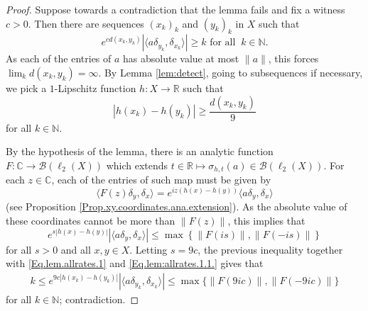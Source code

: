 \documentclass[11pt]{amsart}
\newcommand{\R}{\mathbb{R}}
\newcommand{\N}{\mathbb{N}}
\newcommand{\C}{\mathbb{C}}
\newcommand{\cB}{\mathcal{B}}
\numberwithin{equation}{section}
\theoremstyle{definition}
\theoremstyle{remark}
\begin{document}
\begin{proof}
Suppose towards a contradiction that the lemma fails and fix a witness $c>0$. Then there are sequences $(x_k)_k$ and $(y_k)_k$ in $X$ such that
\begin{equation}\label{Eq.lem.allrates.1}e^{cd(x_k,y_k)}|\langle a\delta_{y_k},\delta_{x_k}\rangle|\geq k \text{ for all }\  k\in\N.
\end{equation} As each of the entries of $a$ has absolute value at most $\|a\|$,  this forces   $\lim_kd(x_k,y_k)=\infty$. By Lemma \ref{lem:detect}, going to subsequences if necessary, we  pick a  $1$-Lipschitz function $h\colon X\to \R$ such that
\begin{equation}\label{Eq.lem:allrates.1.1.} |h(x_{k})-h(y_{k})|\geq \frac{d(x_k,y_k)}{9}\end{equation}
for all $k\in\N$.

By the hypothesis of the lemma, there is an analytic function $F\colon \C\to \cB(\ell_2(X))$ which extends $t\in \R\mapsto \sigma_{h,t}(a)\in \cB(\ell_2(X))$. For each $z\in \C$, each of the entries of such map must be given by
\[\langle F(z)\delta_y,\delta_x\rangle=e^{iz(h(x)-h(y))}\langle a\delta_y,\delta_x\rangle\]
(see Proposition \ref{Prop.xy.coordinates.ana.extension}).
As the absolute value of these coordinates cannot be more than $\|F(z)\|$, this implies that
\[e^{s|h(x)-h(y)|} |\langle a\delta_y,\delta_x\rangle|\leq \max\left\{\|F(is)\|,\|F(-is)\|\right\}\]
for all $s>0$ and all $x,y\in X$. Letting $s=9c$, the previous inequality together with \eqref{Eq.lem.allrates.1} and \eqref{Eq.lem:allrates.1.1.} gives that
\begin{align*}k\leq e^{9c|h(x_k)-h(y_k)|}|\langle a\delta_{y_k},\delta_{x_k}\rangle|\leq \max\{\|F(9ic)\|,\|F(-9ic)\|\}
\end{align*}
for all $k\in\N$; contradiction.
\end{proof}



 
\end{document}

